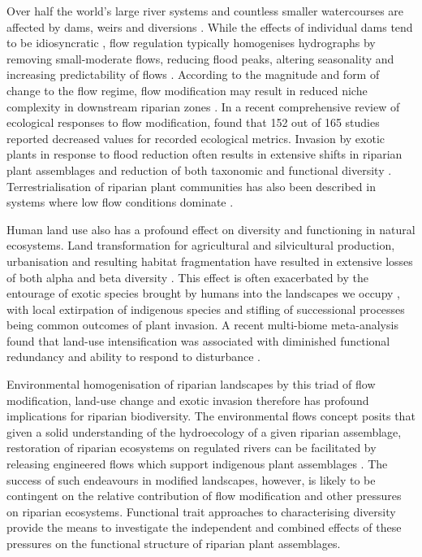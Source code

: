 \documentclass[openright,12pt,a4paper]{memoir}
\begin{document}
Over half the world’s large river systems and countless smaller watercourses are affected by dams, weirs and diversions \citep{Nilsson2000, Nilsson2005}. While the effects of individual dams tend to be idiosyncratic \citep{Mackay2014}, flow regulation typically homogenises hydrographs by removing small-moderate flows, reducing flood peaks, altering seasonality and increasing predictability of flows \citep{Graf2006, Singer2007}. According to the magnitude and form of change to the flow regime, flow modification may result in reduced niche complexity in downstream riparian zones \citep{Lloyd2004}. In a recent comprehensive review of ecological responses to flow modification, \citet{Poff2010} found that 152 out of 165 studies reported decreased values for recorded ecological metrics. Invasion by exotic plants in response to flood reduction often results in extensive shifts in riparian plant assemblages and reduction of both taxonomic and functional diversity \citep{Stokes2008, Merritt2010, Catford2011}. Terrestrialisation of riparian plant communities has also been described in systems where low flow conditions dominate \citep{Poff2010}. 

Human land use also has a profound effect on diversity and functioning in natural ecosystems. Land transformation for agricultural and silvicultural production, urbanisation and resulting habitat fragmentation have resulted in extensive losses of both alpha and beta diversity \citep{Vitousek1997, Gerstner2014}. This effect is often exacerbated by the entourage of exotic species brought by humans into the landscapes we occupy \citep{Vitousek1996}, with local extirpation of indigenous species \citep{Davis2003} and stifling of successional processes \citep{Catford2012a} being common outcomes of plant invasion. A recent multi-biome meta-analysis found that land-use intensification was associated with diminished functional redundancy and ability to respond to disturbance \citep{Laliberte2010}.  

Environmental homogenisation of riparian landscapes by this triad of flow modification, land-use change and exotic invasion therefore has profound implications for riparian biodiversity. The environmental flows concept posits that given a solid understanding of the hydroecology of a given riparian assemblage, restoration of riparian ecosystems on regulated rivers can be facilitated by releasing engineered flows which support indigenous plant assemblages \citep{Poff2010a}. The success of such endeavours in modified landscapes, however, is likely to be contingent on the relative contribution of flow modification and other pressures on riparian ecosystems. Functional trait approaches to characterising diversity provide the means to investigate the independent and combined effects of these pressures on the functional structure of riparian plant assemblages. 
\end{document}
